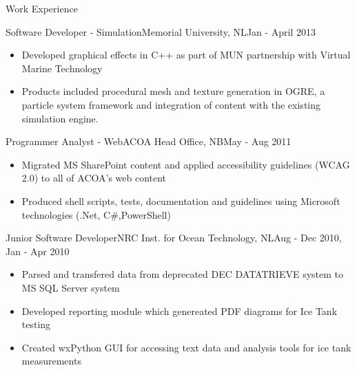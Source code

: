 \documentclass[calibri]{mcdowellcv}
\begin{document}
\begin{cvsection}{Work Experience}
		\begin{cvsubsection}{Software Developer - Simulation}{Memorial University, NL}{Jan -  April 2013}
			\begin{itemize}
				\item Developed graphical effects in C++ as part of MUN partnership with Virtual Marine Technology
				\item Products included procedural mesh and texture generation in OGRE, a particle system framework and integration of content with the existing simulation engine.
			\end{itemize}
		\end{cvsubsection}

		\begin{cvsubsection}{Programmer Analyst - Web}{ACOA Head Office, NB}{May - Aug 2011}
			\begin{itemize}
				\item Migrated MS SharePoint content and applied accessibility guidelines (WCAG 2.0) to all of ACOA's web content
				\item Produced shell scripts, tests, documentation and guidelines using Microsoft technologies (.Net, C\#,PowerShell)
			\end{itemize}
		\end{cvsubsection}

		\begin{cvsubsection}{Junior Software Developer}{NRC Inst. for Ocean Technology, NL}{Aug - Dec 2010, Jan - Apr 2010}
			\begin{itemize}
				\item Parsed and transfered data from deprecated DEC DATATRIEVE system to MS SQL Server system 
				\item Developed reporting module which genereated PDF diagrams for Ice Tank testing 
				\item Created wxPython GUI for accessing text data and analysis tools for ice tank measurements
			\end{itemize}
		\end{cvsubsection}

	\end{cvsection}
	
\end{document}
